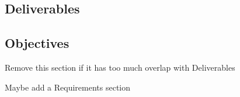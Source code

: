 \subsection{Deliverables}


\subsection{Objectives}

Remove this section if it has too much overlap with Deliverables

Maybe add a Requirements section